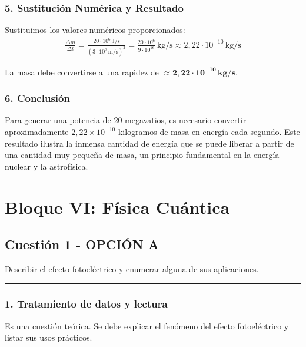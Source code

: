 \subsubsection*{5. Sustitución Numérica y Resultado}
Sustituimos los valores numéricos proporcionados:
\begin{gather}
    \frac{\Delta m}{\Delta t} = \frac{20 \cdot 10^6 \, \text{J/s}}{(3 \cdot 10^8 \, \text{m/s})^2} = \frac{20 \cdot 10^6}{9 \cdot 10^{16}} \, \text{kg/s} \approx 2,22 \cdot 10^{-10} \, \text{kg/s}
\end{gather}
\begin{cajaresultado}
    La masa debe convertirse a una rapidez de $\boldsymbol{\approx 2,22 \cdot 10^{-10} \, \textbf{kg/s}}$.
\end{cajaresultado}

\subsubsection*{6. Conclusión}
\begin{cajaconclusion}
Para generar una potencia de 20 megavatios, es necesario convertir aproximadamente $2,22 \times 10^{-10}$ kilogramos de masa en energía cada segundo. Este resultado ilustra la inmensa cantidad de energía que se puede liberar a partir de una cantidad muy pequeña de masa, un principio fundamental en la energía nuclear y la astrofísica.
\end{cajaconclusion}

\newpage

\section{Bloque VI: Física Cuántica}
\label{sec:cuantica_2000_jun_ord}

\subsection{Cuestión 1 - OPCIÓN A}
\label{subsec:6A_2000_jun_ord}

\begin{cajaenunciado}
Describir el efecto fotoeléctrico y enumerar alguna de sus aplicaciones.
\end{cajaenunciado}
\hrule

\subsubsection*{1. Tratamiento de datos y lectura}
Es una cuestión teórica. Se debe explicar el fenómeno del efecto fotoeléctrico y listar sus usos prácticos.

